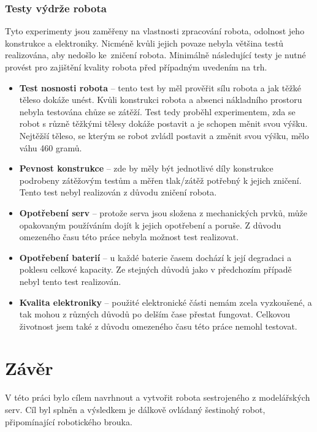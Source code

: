 \subsection*{Testy výdrže robota}
Tyto experimenty jsou zaměřeny na vlastnosti zpracování robota, odolnost jeho konstrukce a elektroniky. Nicméně kvůli jejich povaze nebyla většina testů realizována, aby nedošlo ke~zničení robota. Minimálně následující testy je nutné provést pro zajištění kvality robota před případným uvedením na trh.

\begin{itemize}
    \item \textbf{Test nosnosti robota} -- tento test by měl prověřit sílu robota a jak těžké těleso dokáže unést. Kvůli konstrukci robota a absenci nákladního prostoru nebyla testována chůze se zátěží. Test tedy proběhl experimentem, zda se robot s různě těžkými tělesy dokáže postavit a je schopen měnit svou výšku. Nejtěžší těleso, se kterým se robot zvládl postavit a změnit svou výšku, mělo váhu 460 gramů. 
    \item \textbf{Pevnost konstrukce} -- zde by měly být jednotlivé díly konstrukce podrobeny zátěžovým testům a měřen tlak/zátěž potřebný k jejich zničení. Tento test nebyl realizován z důvodu zničení robota.
    \item \textbf{Opotřebení serv} -- protože serva jsou složena z mechanických prvků, může opakovaným používáním dojít k jejich opotřebení a poruše. Z důvodu omezeného času této práce nebyla možnost test realizovat.
    \item \textbf{Opotřebení baterií} -- u každé baterie časem dochází k její degradaci a poklesu celkové kapacity. Ze stejných důvodů jako v předchozím případě nebyl tento test realizován.
    \item \textbf{Kvalita elektroniky} -- použité elektronické části nemám zcela vyzkoušené, a tak mohou z různých důvodů po delším čase přestat fungovat. Celkovou životnost jsem také z důvodu omezeného času této práce nemohl testovat.
\end{itemize}


\chapter{Závěr}
\label{zaver}
V této práci bylo cílem navrhnout a vytvořit robota sestrojeného z modelářských serv. Cíl byl splněn a výsledkem je dálkově ovládaný šestinohý robot, připomínající robotického brouka.

